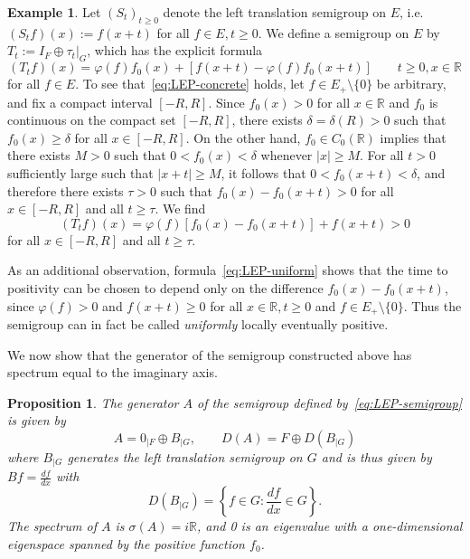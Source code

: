 \documentclass[a4paper, reqno]{amsart}
\numberwithin{equation}{section}
\theoremstyle{plain}
\newtheorem{proposition}[theorem]{Proposition}
\theoremstyle{definition}
\newtheorem{example}[theorem]{Example}
\theoremstyle{remark}
\newcommand{\RR}{\mathbb{R}}
\begin{document}
\begin{example}
	Let $(S_t)_{t\ge 0}$ denote the left translation semigroup on $E$, i.e.\ $(S_t f)(x) := f(x+t)$ for all $f\in E, t\ge 0$. We define a semigroup on $E$ by $T_t := I_F \oplus \tau_t |_{G}$, which has the explicit formula
	\begin{equation}
		\label{eq:LEP-semigroup}
		(T_t f)(x) = \varphi(f)f_0(x) + [f(x+t) - \varphi(f) f_0(x+t)] \qquad t \ge 0, x\in\RR
	\end{equation}
	for all $f \in E$. To see that~\eqref{eq:LEP-concrete} holds, let $f \in E_+ \setminus\{0\}$ be arbitrary, and fix a compact interval $[-R, R]$. Since $f_0(x) > 0$ for all $x \in \RR$ and $f_0$ is continuous on the compact set $[-R, R]$, there exists $\delta=\delta(R) > 0$ such that $f_0(x) \ge\delta$ for all $x \in [-R, R]$. On the other hand, $f_0 \in C_0(\RR)$ implies that there exists $M > 0$ such that $0 < f_0(x) < \delta$ whenever $|x| \ge M$. For all $t > 0$ sufficiently large such that $|x+t| \ge M$, it follows that $0 < f_0(x+t) < \delta$, and therefore there exists $\tau > 0$ such that $f_0(x) - f_0(x+t) > 0$ for all $x \in [-R, R]$ and all $t\ge\tau$. We find
	\begin{equation}
		\label{eq:LEP-uniform}
		(T_t f)(x) = \varphi(f)[f_0(x) - f_0(x+t)] + f(x+t) > 0
	\end{equation}
	for all $x \in [-R,R]$ and all $t \ge \tau$. 
	
	As an additional observation, formula~\eqref{eq:LEP-uniform} shows that the time to positivity can be chosen to depend only on the difference $f_0(x)-f_0(x+t)$, since $\varphi(f)>0$ and $f(x+t) \ge 0$ for all $x\in\RR, t\ge 0$ and $f\in E_+\setminus\{0\}$. Thus the semigroup can in fact be called \emph{uniformly} locally eventually positive.
\end{example}

We now show that the generator of the semigroup constructed above has spectrum equal to the imaginary axis.
\begin{proposition}
\label{prop:example-LEP-semigroup}
	The generator $A$ of the semigroup defined by~\eqref{eq:LEP-semigroup} is given by
	\begin{equation*}
		A = 0_{|F} \oplus B_{|G}, \qquad D(A) = F \oplus D(B_{|G})
	\end{equation*}
	where $B_{|G}$ generates the left translation semigroup on $G$ and is thus given by $Bf = \frac{df}{dx}$ with
	\begin{equation*}
		D(B_{|G}) = \left\{ f \in G : \frac{df}{dx} \in G \right\}.
	\end{equation*}
	The spectrum of $A$ is $\sigma(A) = i\RR$, and 0 is an eigenvalue with a one-dimensional eigenspace spanned by the positive function $f_0$.
\end{proposition}
\end{document}
